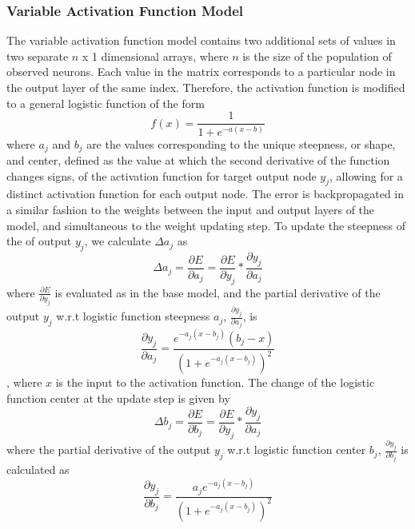 \documentclass[11pt]{article}
\begin{document}
\subsubsection{Variable Activation Function Model}
The variable activation function model contains two additional sets of values in two separate $n$ x 1 dimensional arrays, where $n$ is the size of the population of observed neurons. Each value in the matrix corresponds to a particular node in the output layer of the same index. Therefore, the activation function is modified to a general logistic function of the form $$ f(x) = \frac{1}{1+e^{-a(x - b)}}$$ where $a_j$ and $b_j$ are the values corresponding to the unique steepness, or shape, and center, defined as the value at which the second derivative of the function changes signs, of the activation function for target output node $y_j$, allowing for a distinct activation function for each output node. The error is backpropagated in a similar fashion to the weights between the input and output layers of the model, and simultaneous to the weight updating step. To update the steepness of the of output $y_j$, we calculate $\Delta a_j$ as
 $$\Delta a_j = \frac{\partial E}{\partial a_j} = \frac{\partial E}{\partial y_j} * \frac{\partial y_j}{\partial a_j}$$
 where $\frac{\partial E}{\partial y_j}$ is evaluated as in the base model, and the partial derivative of the output $y_j$ w.r.t logistic function steepness $a_j$, $\frac{\partial y_j}{\partial a_j}$, is 
 $$\frac{\partial y_j}{\partial a_j}=\frac{e^{-a_j(x-b_j)}(b_j - x)}{(1+e^{-a_j(x-b_j)})^2}$$, where $x$ is the input to the activation function. The change of the logistic function center at the update step is given by 
 $$\Delta b_j = \frac{\partial E}{\partial b_j} = \frac{\partial E}{\partial y_j} * \frac{\partial y_j}{\partial a_j}$$ 
 where the partial derivative of the output $y_j$ w.r.t logistic function center $b_j$, $\frac{\partial y_j}{\partial b_j}$ is calculated as 
 $$\frac{\partial y_j}{\partial b_j} = \frac{a_je^{-a_j(x - b_j)}}{(1 + e^{-a_j(x - b_j)})^2} $$
\end{document}
